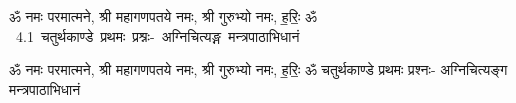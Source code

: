 \documentclass[17pt]{extarticle}
\begin{document}
\begin{titlepage}
    \begin{center}
 
\begin{sanskrit}
    { \Large
    ॐ नमः परमात्मने, श्री महागणपतये नमः, 
श्री गुरुभ्यो नमः, ह॒रिः॒ ॐ 
    }
    \\
    \vspace{2.5cm}
    \mbox{ \Huge
    4.1     चतुर्थकाण्डे प्रथमः प्रश्नः- अग्निचित्यङ्ग मन्त्रपाठाभिधानं   }
\end{sanskrit}
\end{center}

\end{titlepage}
\tableofcontents

ॐ नमः परमात्मने, श्री महागणपतये नमः, 
श्री गुरुभ्यो नमः, ह॒रिः॒ ॐ      चतुर्थकाण्डे प्रथमः प्रश्नः- अग्निचित्यङ्ग मन्त्रपाठाभिधानं \newline

\end{document}
